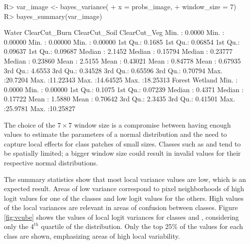 \documentclass[
  shortnames]{jss}
\begin{document}
\begin{CodeChunk}
\begin{CodeInput}
R> var_image <- bayes_variance(
+     x = probs_image,
+     window_size = 7)
R> bayes_summary(var_image)
\end{CodeInput}
\begin{CodeOutput}
 Water             ClearCut_Burn      ClearCut_Soil      ClearCut_Veg      
 Min.   : 0.0000   Min.   : 0.00000   Min.   : 0.00000   Min.   : 0.00000  
 1st Qu.: 0.1685   1st Qu.: 0.06854   1st Qu.: 0.09637   1st Qu.: 0.09687  
 Median : 2.1452   Median : 0.15794   Median : 0.23777   Median : 0.23860  
 Mean   : 2.5155   Mean   : 0.43021   Mean   : 0.84778   Mean   : 0.67935  
 3rd Qu.: 4.6553   3rd Qu.: 0.34528   3rd Qu.: 0.65596   3rd Qu.: 0.70794  
 Max.   :20.7204   Max.   :11.22343   Max.   :14.64525   Max.   :18.25313  
 Forest            Wetland           
 Min.   : 0.0000   Min.   : 0.00000  
 1st Qu.: 0.1075   1st Qu.: 0.07239  
 Median : 0.4371   Median : 0.17722  
 Mean   : 1.5880   Mean   : 0.70642  
 3rd Qu.: 2.3435   3rd Qu.: 0.41501  
 Max.   :25.9781   Max.   :10.25827  
\end{CodeOutput}
\end{CodeChunk}

The choice of the \(7 \times 7\) window size is a compromise between having enough values to
estimate the parameters of a normal distribution and the need to capture local effects
for class patches of small sizes. Classes such as  and 
tend to be spatially limited; a bigger window size could result in invalid values for
their respective normal distributions.

The summary statistics show that most local variance values are low, which is an expected result. Areas of low variance correspond to pixel neighborhoods of high logit values for one of the classes and low logit values for the others. High values of the local variances are relevant in areas of confusion between classes. Figure \ref{fig:vcube} shows the values of local logit variances for classes  and , considering only the \(4^{th}\) quartile of the distribution. Only the top 25\% of the values for each class are shown, emphasizing areas of high local variability.
\end{document}
